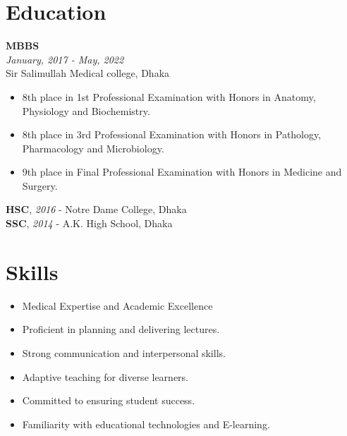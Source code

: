 \documentclass[a4paper,11pt]{article}
\newcommand{\resumeentry}[2]{
    \textbf{#1} \\
    \textit{#2}
}
\begin{document}
\begin{minipage}[t][8.8cm]{0.6\textwidth}
\raggedright
\section*{Education}
\resumeentry{MBBS}{January, 2017 - May, 2022}\\ Sir Salimullah Medical college, Dhaka
\begin{itemize}[left=0em, itemsep=0pt, parsep=0pt]
	\item 8th place in 1st Professional Examination with Honors in Anatomy, Physiology and Biochemistry.
	\item 8th place in 3rd Professional Examination with Honors in Pathology, Pharmacology and Microbiology.
	\item 9th place in Final Professional Examination with Honors in Medicine and Surgery.
\end{itemize}
\textbf{HSC}, \textit{2016} - Notre Dame College, Dhaka \\
\textbf{SSC}, \textit{2014} - A.K. High School, Dhaka \\
\end{minipage}
\hspace{0.5cm}\hspace{0.5cm}
\begin{minipage}[t][8.8cm]{0.31\textwidth}
\raggedright
\section*{Skills}
\begin{itemize}[left=0em, itemsep=0pt, parsep=0pt]
  \item Medical Expertise and Academic Excellence
  \item Proficient in planning and delivering lectures.
  \item Strong communication and interpersonal skills.
  \item Adaptive teaching for diverse learners.
  \item Committed to ensuring student success.
  \item Familiarity with educational technologies and E-learning.
\end{itemize}

\end{minipage}
\end{document}
